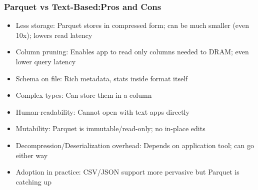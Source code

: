 \documentclass[12pt]{article}
\begin{document}
\subsubsection{Parquet vs Text-Based:Pros and Cons}
\begin{itemize}
    \item Less storage: Parquet stores in compressed form; can be much smaller (even 10x);
    lowers read latency
    \item Column pruning: Enables app to read only columns needed to DRAM; even lower
    query latency
    \item Schema on file: Rich metadata, stats inside format itself
    \item Complex types: Can store them in a column
    \item Human-readability: Cannot open with text apps directly
    \item Mutability: Parquet is immutable/read-only; no in-place edits
    \item Decompression/Deserialization overhead: Depends on application tool; can go
    either way
    \item Adoption in practice: CSV/JSON support more pervasive but Parquet is catching up
\end{itemize}
\end{document}
